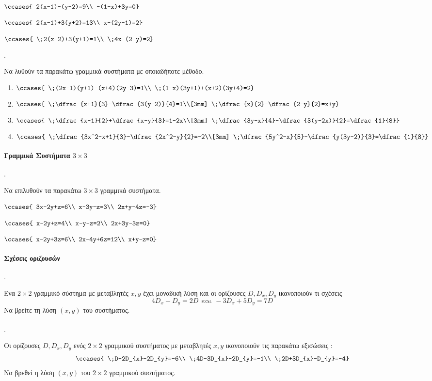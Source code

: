 \documentclass[11pt,a4paper,twocolumn]{article}
\newcounter{askhsh}
\newcommand{\askhsh}{\large\theaskhsh.\ \addtocounter{askhsh}{1}}
\begin{document}
\begin{alist}[leftmargin=3mm]
\item $ \ccases{
2(x-1)-(y-2)=9\\
-(1-x)+3y=0} $
\item $ \ccases{
2(x-1)+3(y+2)=13\\
x-(2y-1)=2} $
\item $\ccases{
\;2(x-2)+3(y+1)=1\\
\;4x-(2-y)=2}$
\end{alist}
\askhsh Να λυθούν τα παρακάτω γραμμικά συστήματα με οποιαδήποτε μέθοδο.
\begin{enumerate}[label=\roman*.,itemsep=3mm]
\item $\ccases{
\;(2x-1)(y+1)-(x+4)(2y-3)=1\\
\;(1-x)(3y+1)+(x+2)(3y+4)=2}$
\item $\ccases{
\;\dfrac{x+1}{3}-\dfrac{3(y-2)}{4}=1\\[3mm]
\;\dfrac{x}{2}-\dfrac{2-y}{2}=x+y}$
\item $\ccases{
\;\dfrac{x-1}{2}+\dfrac{x-y}{3}=1-2x\\[3mm]
\;\dfrac{3y-x}{4}-\dfrac{3(y-2x)}{2}=\dfrac{1}{8}}$
\item $\ccases{
\;\dfrac{3x^2-x+1}{3}-\dfrac{2x^2-y}{2}=-2\\[3mm]
\;\dfrac{5y^2-x}{5}-\dfrac{y(3y-2)}{3}=\dfrac{1}{8}}$
\end{enumerate}
\paragraph{Γραμμικά Συστήματα $ 3\times3$}
\askhsh Να επιλυθούν τα παρακάτω $ 3\times3 $ γραμμικά συστήματα.
\begin{multicols}{2}
\begin{alist}
\item $\ccases{
3x-2y+z=6\\
x-3y-z=3\\
2x+y-4z=-3}$
\item $\ccases{
x-2y+z=4\\
x-y-z=2\\
2x+3y-3z=0}$
\item $\ccases{
x-2y+3z=6\\
2x-4y+6z=12\\
x+y-z=0}$
\end{alist}\end{multicols}
\paragraph{Σχέσεις οριζουσών}
\askhsh Ένα $2\times 2$ γραμμικό σύστημα με μεταβλητές $x,y$ έχει μοναδική λύση και οι ορίζουσες $D,D_x,D_y$ ικανοποιούν τι σχέσεις
\[ 4D_x-D_y=2D\ \ \text{και}\ \ -3D_x+5D_y=7D \]
Να βρείτε τη λύση $(x,y)$ του συστήματος.\\\\
\askhsh Οι ορίζουσες $ D,D_x,D_y $ ενός $ 2\times2 $ γραμμικού συστήματος με μεταβλητές $ x,y $ ικανοποιούν τις παρακάτω εξισώσεις :
\[ \ccases{
\;D-2D_{x}-2D_{y}=-6\\
\;4D-3D_{x}-2D_{y}=-1\\
\;2D+3D_{x}-D_{y}=-4} \]
Να βρεθεί η λύση $ (x,y) $ του $ 2\times2 $ γραμμικού συστήματος.
\end{document}

